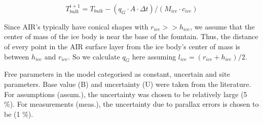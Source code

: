 \documentclass[utf8]{frontiersSCNS} %
\begin{document}
\begin{equation} T_{bulk}^{i+1} = T_{bulk} - (q_{G} \cdot A \cdot \Delta t)/(M_{ice} \cdot c_{ice}) \end{equation}

Since AIR's typically have conical shapes with $r_{ice} >> h_{ice}$, we assume that the center of mass of the ice body
is near the base of the fountain. Thus, the distance of every point in the AIR surface layer from the ice body's center
of mass is between $h_{ice}$ and $r_{ice}$. So we calculate $q_{G}$ here assuming $l_{ice} = (r_{ice} + h_{ice})/2$. 

\begin{table} \caption{Free parameters in the model categorised as constant, uncertain and site parameters. Base
  value (B) and uncertainty (U) were taken from the literature. For assumptions (assum.), the uncertainty was chosen
to be relatively large (5 \%). For measurements (meas.), the uncertainty due to parallax errors is chosen to be (1
\%).}
    

\end{table}
\end{document}
